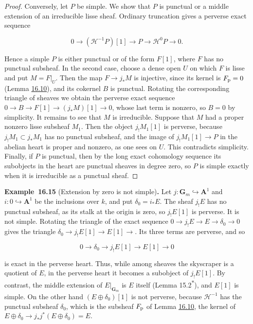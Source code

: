 \documentclass[11pt]{article}
\newenvironment{bpstatement}[2]{\par\addvspace{0.6\baselineskip}\noindent\textbf{#1}#2\textbf{.}\enspace\ignorespaces}
  {\par\addvspace{0.4\baselineskip}}
\newcommand{\bpout}[1]{#1\textsuperscript{\hyperlink{bp-outside}{\ensuremath{\ast}}}}
\begin{document}
\begin{proof}[{Proof}]
Conversely, let \(P\) be simple. We show that \(P\) is punctual or a middle extension of an irreducible lisse sheaf. Ordinary truncation gives a perverse exact sequence

\[
0\longrightarrow(\mathcal H^{-1}P)[1]
\longrightarrow P\longrightarrow\mathcal H^0P\longrightarrow0.
\]

Hence a simple \(P\) is either punctual or of the form \(F[1]\), where \(F\) has no punctual subsheaf. In the second case, choose a dense open \(U\) on which \(F\) is lisse and put \(M=F|_U\). Then the map \(F\to j_*M\) is injective, since its kernel is \(F_{\rm p}=0\) (Lemma \hyperref[bp33]{16.10}), and its cokernel \(B\) is punctual. Rotating the corresponding triangle of sheaves we obtain the perverse exact sequence \(0\to B\to F[1]\to(j_*M)[1]\to0\), whose last term is nonzero, so \(B=0\) by simplicity. It remains to see that \(M\) is irreducible. Suppose that \(M\) had a proper nonzero lisse subsheaf \(M_1\). Then the object \(j_!M_1[1]\) is perverse, because \(j_!M_1\subset j_*M_1\) has no punctual subsheaf, and the image of \(j_!M_1[1]\to P\) in the abelian heart is proper and nonzero, as one sees on \(U\). This contradicts simplicity. Finally, if \(P\) is punctual, then by the long exact cohomology sequence its subobjects in the heart are punctual sheaves in degree zero, so \(P\) is simple exactly when it is irreducible as a punctual sheaf.
\end{proof}

\label{bp45}%
\begin{bpstatement}{Example~16.15}{ (Extension by zero is not simple)}
Let \(j:\mathbf G_m\hookrightarrow\mathbf A^1\) and \(i:0\hookrightarrow\mathbf A^1\) be the inclusions over \(k\), and put \(\delta_0=i_*E\). The sheaf \(j_!E\) has no punctual subsheaf, as its stalk at the origin is zero, so \(j_!E[1]\) is perverse. It is not simple. Rotating the triangle of the exact sequence \(0\to j_!E\to E\to\delta_0\to0\) gives the triangle \(\delta_0\to j_!E[1]\to E[1]\to\). Its three terms are perverse, and so

\[
0\longrightarrow\delta_0\longrightarrow j_!E[1]
\longrightarrow E[1]\longrightarrow0
\]

is exact in the perverse heart. Thus, while among sheaves the skyscraper is a quotient of \(E\), in the perverse heart it becomes a subobject of \(j_!E[1]\). By contrast, the middle extension of \(E|_{\mathbf G_m}\) is \(E\) itself (Lemma \bpout{15.2}), and \(E[1]\) is simple. On the other hand \((E\oplus\delta_0)[1]\) is not perverse, because \(\mathcal H^{-1}\) has the punctual subsheaf \(\delta_0\), which is the subsheaf \(F_{\rm p}\) of Lemma \hyperref[bp33]{16.10}, the kernel of \(E\oplus\delta_0\to j_*j^*(E\oplus\delta_0)=E\).
\end{bpstatement}
\end{document}
